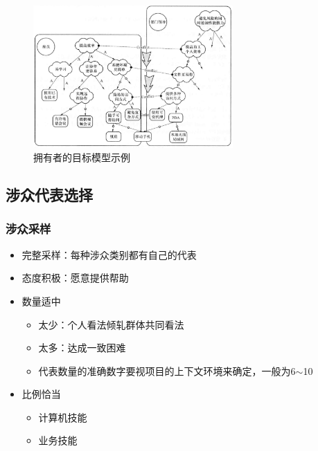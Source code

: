 \begin{figure}[H]
    \vspace{-0.5em}
	\centering
	\includegraphics[width=0.68\textwidth]{img/拥有者的目标模型示例.png}
    \caption*{拥有者的目标模型示例}
    \vspace{-1.3em}
\end{figure}

\subsection{涉众代表选择}

\subsubsection{涉众采样}
\begin{itemize}
    \item 完整采样：每种涉众类别都有自己的代表
    \item 态度积极：愿意提供帮助
    \item 数量适中
    \begin{itemize}
        \item 太少：个人看法倾轧群体共同看法
        \item 太多：达成一致困难 
        \item 代表数量的准确数字要视项目的上下文环境来确定，一般为6$\sim$10
    \end{itemize}
    \item 比例恰当
    \vspace{-0.8em}
	\begin{multicols}{2}
        \begin{itemize}
            \item 计算机技能
            \item 业务技能
        \end{itemize}
	\end{multicols}
	\vspace{-1em}
\end{itemize}


